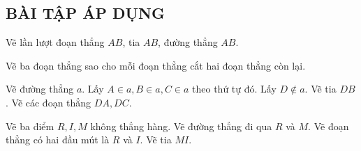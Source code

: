\subsection{BÀI TẬP ÁP DỤNG}
\begin{bt}
Vẽ lần lượt đoạn thẳng $AB$, tia $AB$, đường thẳng $AB$.
\end{bt}   \begin{bt}
Vẽ ba đoạn thẳng sao cho mỗi đoạn thẳng cắt hai đoạn thẳng còn lại.
\end{bt}   \begin{bt}
Vẽ đường thẳng $a$. Lấy $A \in a, B \in a, C \in a$ theo thứ tự đó. Lấy $D \notin a$. Vẽ tia $DB$. Vẽ các đoạn thẳng $DA, DC$.
\end{bt}   \begin{bt}
Vẽ ba điểm $R, I, M$ không thẳng hàng. Vẽ đường thẳng đi qua $R$ và $M$. Vẽ đoạn thẳng có hai đầu mút là $R$ và $I$. Vẽ tia $MI$.

\end{bt}
